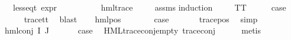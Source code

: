 \begin{isabellebody}
\ \ \ {\isachardoublequoteopen}{\isacharparenleft}{\kern0pt}less{\isacharunderscore}{\kern0pt}eq{\isacharunderscore}{\kern0pt}t\ {\isacharparenleft}{\kern0pt}expr\ {\isasymphi}{\isacharparenright}{\kern0pt}\ {\isacharparenleft}{\kern0pt}{\isasyminfinity}{\isacharcomma}{\kern0pt}\ {}{\isacharcomma}{\kern0pt}\ {}{\isacharcomma}{\kern0pt}\ {}{\isacharcomma}{\kern0pt}\ {}{\isacharcomma}{\kern0pt}\ {}{\isacharparenright}{\kern0pt}{\isacharparenright}{\kern0pt}{\isachardoublequoteclose}\isanewline
\ \ \ {\isachardoublequoteopen}{\isacharparenleft}{\kern0pt}hml{\isacharunderscore}{\kern0pt}trace\ {\isasymphi}{\isacharparenright}{\kern0pt}{\isachardoublequoteclose}\isanewline
%
\isadelimproof
\ \ %
\endisadelimproof
%
\isatagproof
{}\isamarkupfalse%
\ assms\isanewline
{}\isamarkupfalse%
{\isacharparenleft}{\kern0pt}induction\ {\isasymphi}{\isacharparenright}{\kern0pt}\isanewline
\ \ \isamarkupfalse%
\ TT\isanewline
\ \ \isamarkupfalse%
\ \isamarkupfalse%
\ {\isacharquery}{\kern0pt}case\isanewline
\ \ \ \ \isamarkupfalse%
\ trace{\isacharunderscore}{\kern0pt}tt\ \isamarkupfalse%
\ blast\isanewline
{}\isamarkupfalse%
\isanewline
\ \ \isamarkupfalse%
\ {\isacharparenleft}{\kern0pt}hml{\isacharunderscore}{\kern0pt}pos\ {\isasymalpha}\ {\isasymphi}{\isacharparenright}{\kern0pt}\isanewline
\ \ \isamarkupfalse%
\ \isamarkupfalse%
\ {\isacharquery}{\kern0pt}case\ \isanewline
\ \ \ \ \isamarkupfalse%
\ trace{\isacharunderscore}{\kern0pt}pos\ \isamarkupfalse%
\ simp\isanewline
{}\isamarkupfalse%
\isanewline
\ \ \isamarkupfalse%
\ {\isacharparenleft}{\kern0pt}hml{\isacharunderscore}{\kern0pt}conj\ I\ J\ {\isasymPhi}{\isacharparenright}{\kern0pt}\isanewline
\ \ \isamarkupfalse%
\ \isamarkupfalse%
\ {\isacharquery}{\kern0pt}case\ \isamarkupfalse%
\ HML{\isacharunderscore}{\kern0pt}trace{\isacharunderscore}{\kern0pt}conj{\isacharunderscore}{\kern0pt}empty\ trace{\isacharunderscore}{\kern0pt}conj\isanewline
\ \ \ \ \isamarkupfalse%
\ metis\isanewline
{}\isamarkupfalse%
\isanewline
%
\endisatagproof
{\isafoldproof}%
%
\isadelimproof
%
\endisadelimproof
%
\isadelimvisible
%
\endisadelimvisible
%
\isatagvisible
%
\endisatagvisible
{\isafoldvisible}%
%
\isadelimvisible

\end{isabellebody}

